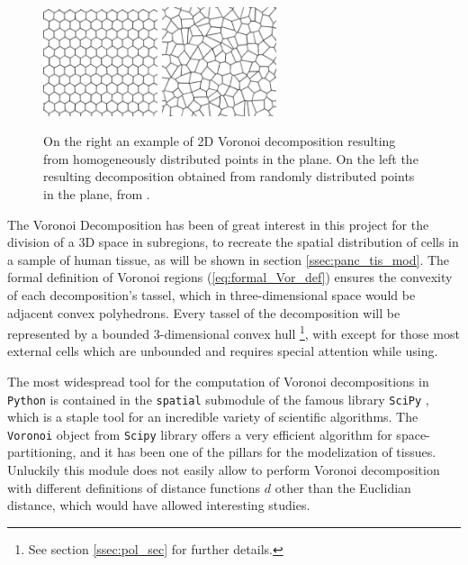    \begin{figure}
        \centering
        \includegraphics[width = 0.3\textwidth]{images/reg_pt}
        \includegraphics[width = 0.3\textwidth]{images/ran_pt}
        \caption{On the right an example of 2D Voronoi decomposition resulting from homogeneously distributed points in the plane. On the left the resulting decomposition obtained from randomly distributed points in the plane, from \cite{ALSAYEDNOOR201644}.}
        \label{fig:diff_pt}
    \end{figure}

    The Voronoi Decomposition has been of great interest in this project for the division of a 3D space in subregions, to recreate the spatial distribution of cells in a sample of human tissue, as will be shown in section \ref{ssec:panc_tis_mod}. The formal definition of Voronoi regions (\ref{eq:formal_Vor_def}) ensures the convexity of each decomposition's tassel, which in three-dimensional space would be adjacent convex polyhedrons. Every tassel of the decomposition will be represented by a bounded 3-dimensional convex hull \footnote{See section \ref{ssec:pol_sec} for further details.}, with except for those most external cells which are unbounded and requires special attention while using.

    The most widespread tool for the computation of Voronoi decompositions in \texttt{Python} is contained in the \texttt{spatial} submodule of the famous library \texttt{SciPy} \cite{2020SciPy-NMeth}, which is a staple tool for an incredible variety of scientific algorithms. The \texttt{Voronoi} object from \texttt{Scipy} library offers a very efficient algorithm for space-partitioning, and it has been one of the pillars for the modelization of tissues. Unluckily this module does not easily allow to perform Voronoi decomposition with different definitions of distance functions $d$ other than the Euclidian distance, which would have allowed interesting studies.

